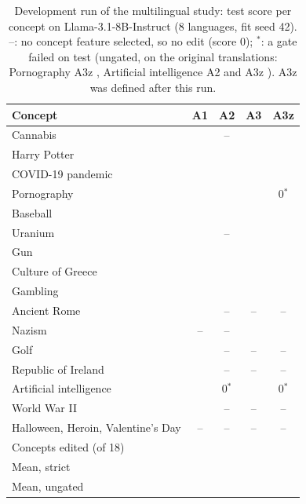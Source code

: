 \begin{table}[ht]
\centering
\footnotesize
\setlength{\tabcolsep}{4pt}
\begin{tabular}{@{}P{3.1cm}cccc@{}}
\toprule
Concept & A1 & A2 & A3 & A3z \\
\midrule
Cannabis &  & -- &  &  \\
Harry Potter &  &  &  &  \\
COVID-19 pandemic &  &  &  &  \\
Pornography &  &  &  & 0$^*$ \\
Baseball &  &  &  &  \\
Uranium &  & -- &  &  \\
Gun &  &  &  &  \\
Culture of Greece &  &  &  &  \\
Gambling &  &  &  &  \\
Ancient Rome &  & -- & -- & -- \\
Nazism & -- & -- &  &  \\
Golf &  & -- & -- & -- \\
Republic of Ireland &  & -- & -- & -- \\
Artificial intelligence &  & 0$^*$ &  & 0$^*$ \\
World War II &  & -- & -- & -- \\
Halloween, Heroin, Valentine's Day & -- & -- & -- & -- \\
\midrule
Concepts edited (of 18) &  &  &  &  \\
Mean, strict &  &  &  &  \\
Mean, ungated &  &  &  &  \\
\bottomrule
\end{tabular}
\caption{Development run of the multilingual study: test score per concept on Llama-3.1-8B-Instruct (8 languages, fit seed 42). --: no concept feature selected, so no edit (score 0); $^*$: a gate failed on test (ungated, on the original translations: Pornography A3z , Artificial intelligence A2  and A3z ). A3z was defined after this run.}
\label{tab:ml-dev}
\end{table}

